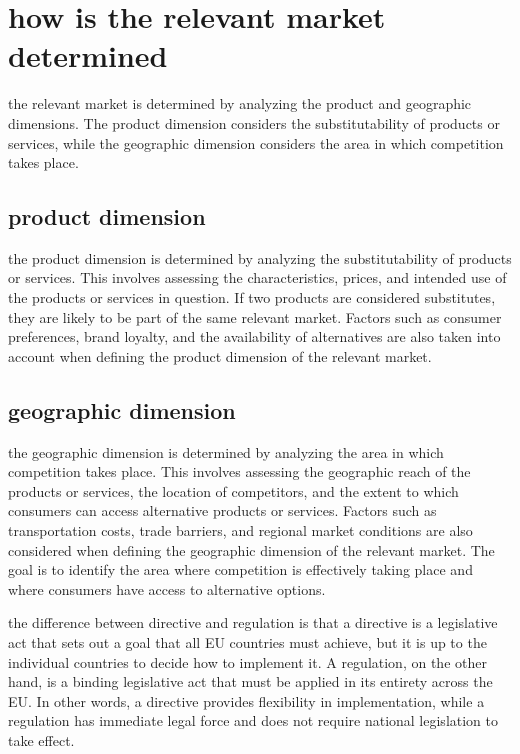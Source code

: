 \documentclass[12pt,a4paper]{report}
\begin{document}
\section{how is the relevant market determined}
the relevant market is determined by analyzing the product and geographic dimensions. The product dimension considers the substitutability of products or services, while the geographic dimension considers the area in which competition takes place.
\subsection{product dimension}
the product dimension is determined by analyzing the substitutability of products or services. This involves assessing the characteristics, prices, and intended use of the products or services in question. If two products are considered substitutes, they are likely to be part of the same relevant market. Factors such as consumer preferences, brand loyalty, and the availability of alternatives are also taken into account when defining the product dimension of the relevant market.
\subsection{geographic dimension}
the geographic dimension is determined by analyzing the area in which competition takes place. This involves assessing the geographic reach of the products or services, the location of competitors, and the extent to which consumers can access alternative products or services. Factors such as transportation costs, trade barriers, and regional market conditions are also considered when defining the geographic dimension of the relevant market. The goal is to identify the area where competition is effectively taking place and where consumers have access to alternative options.


the difference between directive and regulation is that a directive is a legislative act that sets out a goal that all EU countries must achieve, but it is up to the individual countries to decide how to implement it. A regulation, on the other hand, is a binding legislative act that must be applied in its entirety across the EU. In other words, a directive provides flexibility in implementation, while a regulation has immediate legal force and does not require national legislation to take effect.
\end{document}
